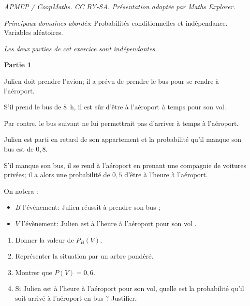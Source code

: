 \documentclass[10pt]{article}
\begin{document}
\noindent\textit{APMEP / CoopMaths. CC BY-SA. Présentation adaptée par Maths Explorer.}\par\medskip
\medskip

\emph{Principaux domaines abordés}: Probabilités conditionnelles et indépendance. Variables aléatoires.

\medskip

\begin{center}\emph{Les deux parties de cet exercice sont indépendantes.}\end{center}

\textbf{Partie 1}

\medskip

Julien doit prendre l'avion; il a prévu de prendre le bus pour se rendre à l'aéroport. 

S'il prend le bus de $8$~h, il est sûr d'être à l'aéroport à temps pour son vol.

Par contre, le bus suivant ne lui permettrait pas d'arriver à temps à l'aéroport.

Julien est parti en retard de son appartement et la probabilité qu'il manque son bus est de $0,8$.

S'il manque son bus, il se rend à l'aéroport en prenant une compagnie de voitures privées; il a alors une probabilité de $0,5$ d'être à l'heure à l'aéroport.

\smallskip

On notera :

\setlength\parindent{12mm}
\begin{itemize}
\item[$\bullet~~$] $B$ l'évènement: \og Julien réussit à prendre son bus \fg ;
\item[$\bullet~~$] $V$ l'évènement: \og Julien est à l'heure à l'aéroport pour son vol \fg.
\end{itemize}
\setlength\parindent{0mm}

\medskip

\begin{enumerate}
\item Donner la valeur de $P_B(V)$.
\item Représenter la situation par un arbre pondéré.
\item Montrer que $P(V) = 0,6$.
\item Si Julien est à l'heure à l'aéroport pour son vol, quelle est la probabilité qu'il soit arrivé à l'aéroport en bus ? Justifier.
\end{enumerate}

\bigskip
\end{document}
